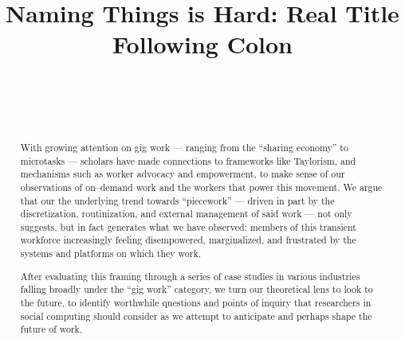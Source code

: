 \documentclass{sigchi}
\def\plaintitle{Naming Things is Hard: Real Title Following Colon}
\begin{document}
\balance{}
\title{\plaintitle}

\author{%
  \\
  \\
  \\
}

\maketitle

\begin{abstract}
  With growing attention on gig work
  --- ranging from the ``sharing economy'' to microtasks ---
  scholars have made connections to frameworks like Taylorism,
  and mechanisms such as worker advocacy and empowerment,
  to make sense of our observations of
  on--demand work and the workers that power this movement.
  We argue that our the underlying trend towards ``piecework''
  --- driven in part by the discretization,
  routinization,
  and external management of said work ---
  not only suggests, but in fact generates what we have observed:
  members of this transient workforce increasingly feeling
  disempowered,
  marginalized,
  and frustrated by the systems and platforms on which they work.
  
  After evaluating this framing
  through a series of case studies
  in various industries falling broadly under the ``gig work'' category,
  we turn our theoretical lens to look to the future,
  to identify worthwhile questions and
  points of inquiry that researchers in social computing should consider
  as we attempt to anticipate and perhaps shape the future of work.
\end{abstract}

 
\end{document}
